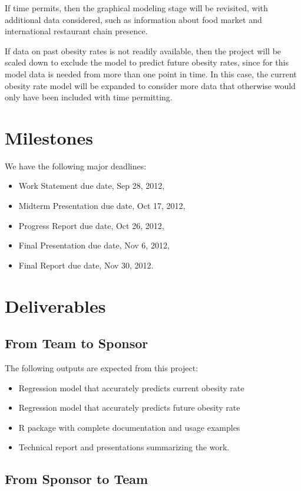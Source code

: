 \documentclass[12pt,letterpaper]{article}
\theoremstyle{definition}
\begin{document}
If time permits, then the graphical modeling stage will be revisited, with additional data considered, such as information about food market and international restaurant chain presence.

If data on past obesity rates is not readily available, then the project will be scaled down to exclude the model to predict future obesity rates, since for this model data is needed from more than one point in time. In this case, the current obesity rate model will be expanded to consider more data that otherwise would only have been included with time permitting.
  
\section{Milestones}
We have the following major deadlines:
\begin{itemize}
    \item Work Statement due date, Sep 28, 2012,
    \item Midterm Presentation due date, Oct 17, 2012,
    \item Progress Report due date, Oct 26, 2012,
    \item Final Presentation due date, Nov 6, 2012,
    \item Final Report due date, Nov 30, 2012.
\end{itemize}

\section{Deliverables}
\subsection{From Team to Sponsor} %
The following outputs are expected from this project:
\begin{itemize}
    \item Regression model that accurately predicts current obesity rate 
    \item Regression model that accurately predicts future obesity rate
    \item R package with complete documentation and usage examples
    \item Technical report and presentations summarizing the work. 
\end{itemize}

\subsection{From Sponsor to Team} %
\end{document}
